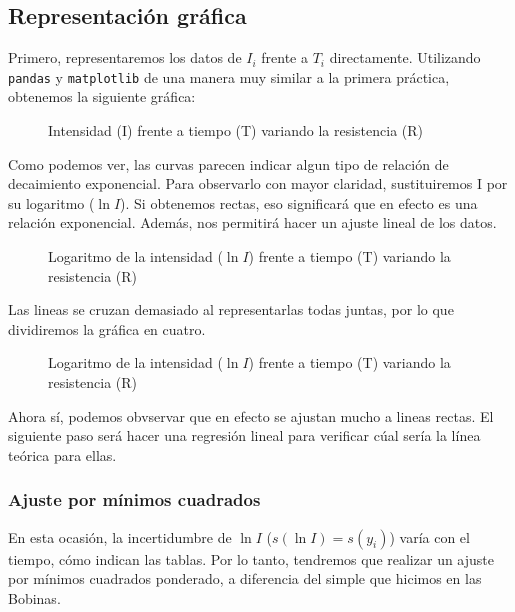 \documentclass[12pt, a4paper, titlepage]{article}
\newcommand{\code}[1]{\texttt{#1}} %
\begin{document}
  \newpage
  \subsection{Representación gráfica}

  Primero, representaremos los datos de $I_i$ frente a $T_i$ directamente. Utilizando \code{pandas} y \code{matplotlib} de una manera muy similar a la primera práctica, obtenemos la siguiente gráfica:

  \begin{figure}[H]
    \hspace{3em} 
    \caption{Intensidad (I) frente a tiempo (T) variando la resistencia (R)}
  \end{figure}

  Como podemos ver, las curvas parecen indicar algun tipo de relación de decaimiento exponencial. Para observarlo con mayor claridad, sustituiremos I por su logaritmo ($\ln{I}$). Si obtenemos rectas, eso significará que en efecto es una relación exponencial. Además, nos permitirá hacer un ajuste lineal de los datos.

  \begin{figure}[H]
    \hspace{1.8em} 
    \caption{Logaritmo de la intensidad ($\ln{I}$) frente a tiempo (T) variando la resistencia (R)}
  \end{figure}

  Las lineas se cruzan demasiado al representarlas todas juntas, por lo que dividiremos la gráfica en cuatro.

  \begin{figure}[H]
    \hspace{0.2em} 
    \caption{Logaritmo de la intensidad ($\ln{I}$) frente a tiempo (T) variando la resistencia (R)}
  \end{figure}

  Ahora sí, podemos obvservar que en efecto se ajustan mucho a lineas rectas. El siguiente paso será hacer una regresión lineal para verificar cúal sería la línea teórica para ellas.

  \newpage
  \subsubsection{Ajuste por mínimos cuadrados}

  En esta ocasión, la incertidumbre de $\ln{I}$ ($s(\ln{I}) = s(y_i)$) varía con el tiempo, cómo indican las tablas. Por lo tanto, tendremos que realizar un ajuste por mínimos cuadrados ponderado, a diferencia del simple que hicimos en las Bobinas.
\end{document}
